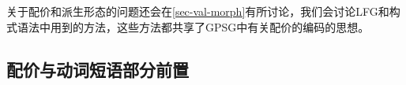 关于配价和派生形态的问题还会在\ref{sec-val-morph}有所讨论，我们会讨论LFG\indexlfgc 和构式语法\indexcxgc 中用到的方法，这些方法都共享了GPSG中有关配价的编码的思想。

\subsection{配价与动词短语部分前置}

